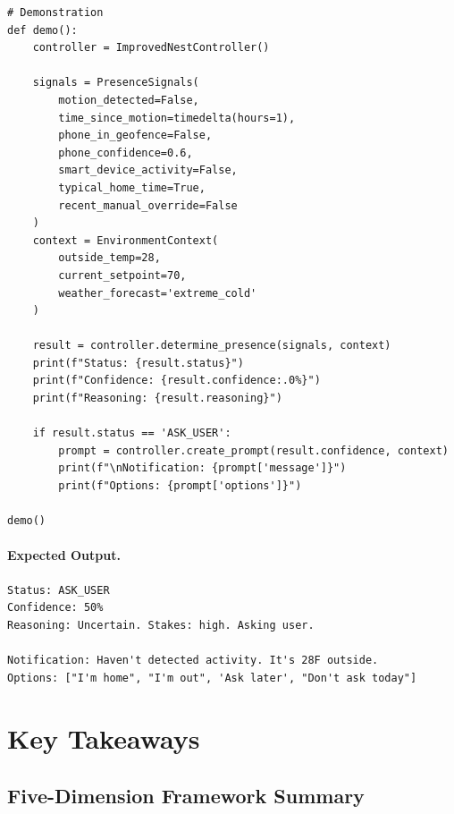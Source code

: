 \begin{lstlisting}[style=python, caption={Complete ImprovedNestController implementation}]
# Demonstration
def demo():
    controller = ImprovedNestController()

    signals = PresenceSignals(
        motion_detected=False,
        time_since_motion=timedelta(hours=1),
        phone_in_geofence=False,
        phone_confidence=0.6,
        smart_device_activity=False,
        typical_home_time=True,
        recent_manual_override=False
    )
    context = EnvironmentContext(
        outside_temp=28,
        current_setpoint=70,
        weather_forecast='extreme_cold'
    )

    result = controller.determine_presence(signals, context)
    print(f"Status: {result.status}")
    print(f"Confidence: {result.confidence:.0%}")
    print(f"Reasoning: {result.reasoning}")

    if result.status == 'ASK_USER':
        prompt = controller.create_prompt(result.confidence, context)
        print(f"\nNotification: {prompt['message']}")
        print(f"Options: {prompt['options']}")

demo()
\end{lstlisting}

\paragraph{Expected Output.}
\begin{lstlisting}[language={}, caption={Expected output from demo()}]
Status: ASK_USER
Confidence: 50%
Reasoning: Uncertain. Stakes: high. Asking user.

Notification: Haven't detected activity. It's 28F outside.
Options: ["I'm home", "I'm out", 'Ask later', "Don't ask today"]
\end{lstlisting}

\section{Key Takeaways}

\subsection{Five-Dimension Framework Summary}

